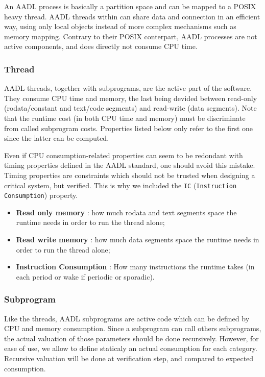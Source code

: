 An AADL process is basically a partition space and can be mapped to a
POSIX heavy thread. AADL threads within can share data and connection 
in an efficient way, using only local objects instead of more complex
mechanisms such as memory mapping. Contrary to their POSIX conterpart, 
AADL processes are not active components, and does directly not consume 
CPU time.

\subsubsection {Thread}

AADL threads, together with subprograms, are the active part of the 
software. They consume CPU time and memory, the last being devided 
between read-only (rodata/constant and text/code segments) and read-write 
(data segments). 
Note that the runtime cost (in both CPU time and memory) must be 
discriminate from called subprogram costs. Properties listed below 
only refer to the first one since the latter can be computed.

Even if CPU consumption-related properties can seem to be redondant 
with timing properties defined in the AADL standard, one should avoid 
this mistake. Timing properties are constraints which should not be 
trusted when designing a critical system, but verified. This is why 
we included the \texttt{IC} (\texttt{Instruction Consumption}) 
property.

\begin{itemize}
\item \textbf {Read only memory} : how much rodata and text segments 
space the runtime needs in order to run the thread alone;
\item \textbf {Read write memory} : how much data segments space the 
runtime needs in order to run the thread alone;
\item \textbf {Instruction Consumption} : How many instructions the 
runtime takes (in each period or wake if periodic or sporadic).
\end{itemize}

\subsubsection {Subprogram}

Like the threads, AADL subprograms are active code which can be 
defined by CPU and memory consumption. Since a subprogram can call 
others subprograms, the actual valuation of those parameters should 
be done recursively. However, for ease of use, we allow to define 
staticaly an actual consumption for each category. Recursive 
valuation will be done at verification step, and compared to 
expected consumption.

